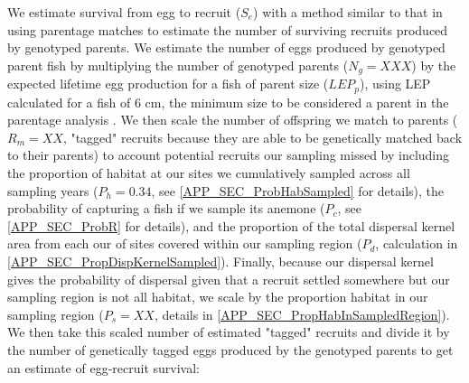 \documentclass[12pt, oneside]{article}   	%
\begin{document}
We estimate survival from egg to recruit ($S_e$) with a method similar to that in \cite{johnson2018integrating} using parentage matches to estimate the number of surviving recruits produced by genotyped parents. We estimate the number of eggs produced by genotyped parent fish by multiplying the number of genotyped parents ($N_g = XXX$) by the expected lifetime egg production for a fish of parent size ($LEP_p$), using LEP calculated for a fish of 6 cm, the minimum size to be considered a parent in the parentage analysis \citep{catalanoInPrepconnectivity}. We then scale the number of offspring we match to parents ($R_m = XX$, "tagged" recruits because they are able to be genetically matched back to their parents) to account potential recruits our sampling missed by including the proportion of habitat at our sites we cumulatively sampled across all sampling years ($P_h = 0.34$, see \ref{APP_SEC_ProbHabSampled} for details), the probability of capturing a fish if we sample its anemone ($P_c$, see \ref{APP_SEC_ProbR} for details), and the proportion of the total dispersal kernel area from each our of sites covered within our sampling region ($P_d$, calculation in \ref{APP_SEC_PropDispKernelSampled}). Finally, because our dispersal kernel gives the probability of dispersal given that a recruit settled somewhere but our sampling region is not all habitat, we scale by the proportion habitat in our sampling region ($P_s = XX$, details in \ref{APP_SEC_PropHabInSampledRegion}). We then take this scaled number of estimated "tagged" recruits and divide it by the number of genetically tagged eggs produced by the genotyped parents to get an estimate of egg-recruit survival:
\end{document}
